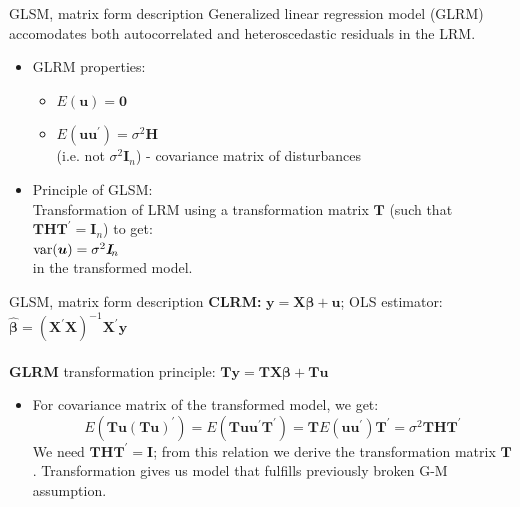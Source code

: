 \documentclass{beamer}
\begin{document}
\begin{frame}{GLSM, matrix form description}
Generalized linear regression model (GLRM) accomodates both autocorrelated and heteroscedastic residuals in the LRM.\\ \medskip
\begin{itemize}
\item GLRM properties:
\begin{itemize}
\item $E(\boldsymbol{u})=\boldsymbol{0}$
\item $E(\boldsymbol{uu}^{\prime})=\sigma^2\boldsymbol{H}$ \\ (i.e. not $\sigma^2 \boldsymbol{I}_{\! n}$) - covariance matrix of disturbances
\end{itemize}
\vspace{0.5cm}
\item Principle of GLSM: \\Transformation of LRM using a transformation matrix $\boldsymbol{T}$ (such that $\bm{THT}^{\prime}=\bm{I}_n$) to get: \\ \medskip
$\textnormal{var}(\boldsymbol{u}) = \sigma^2 \boldsymbol{I}_{\! n}$ \\ \medskip
in the transformed model.
\end{itemize}
\end{frame}
\begin{frame}{GLSM, matrix form description}
\textbf{CLRM:} \hspace{0.2cm} $\boldsymbol{y}=\boldsymbol{X}\boldsymbol{\beta}+\boldsymbol{u}$; OLS estimator: $\boldsymbol{\hat{\beta}}=(\boldsymbol{X}^{\prime}\boldsymbol{X})^{-1}\boldsymbol{X}^{\prime}\boldsymbol{y}$ \\
~\\
\textbf{GLRM} transformation principle:  $\boldsymbol{T}\boldsymbol{y}=\boldsymbol{TX}\boldsymbol{\beta}+\boldsymbol{T}\boldsymbol{u}$\\ \medskip
\begin{itemize}
\item For covariance matrix of the transformed model, we get:
$$E(\boldsymbol{T}\boldsymbol{u}(\boldsymbol{T}\boldsymbol{u})^{\prime})=
E(\boldsymbol{T}\boldsymbol{u}\boldsymbol{u}^{\prime}\boldsymbol{T}^{\prime})=\boldsymbol{T} E(\boldsymbol{u}\boldsymbol{u}^{\prime})\boldsymbol{T}^{\prime}=\sigma^2\boldsymbol{THT}^{\prime}$$
We need $\boldsymbol{THT}^{\prime} \! = \boldsymbol{I}$; from this relation we derive the transformation matrix $\boldsymbol{T}$.
Transformation gives us model that fulfills previously broken G-M assumption.
\end{itemize}
\end{frame}
\end{document}
